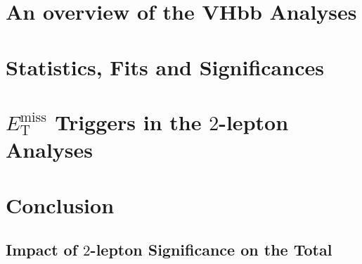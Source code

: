 \documentclass[12pt,titlepage,oneside]{book}
\newcommand{\met}{\ensuremath{E_{\text{T}}^{\text{miss}}} }            %
\newcommand{\tlep}{\ensuremath{2}-lepton }
\begin{document}
\chapter{An overview of the VHbb Analyses}
\label{chap:Analyses}


\chapter{Statistics, Fits and Significances}
\label{chap:Statfits}


\chapter{\met Triggers in the \tlep Analyses}
\label{chap:METTriggerStudy}


\chapter{Conclusion}
\label{chap:conc}


\begin{appendices}
\chapter{Impact of \tlep Significance on the Total}

\label{app:reqsig}
\end{appendices}

\backmatter  %


\end{document}
